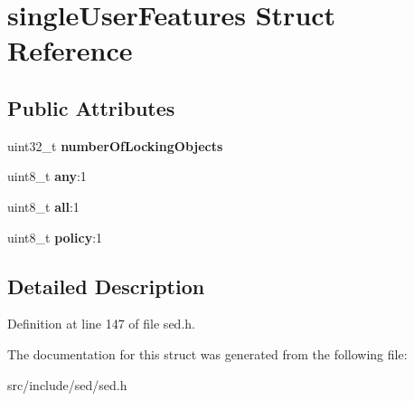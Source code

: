 \hypertarget{structsingleUserFeatures}{}\section{single\+User\+Features Struct Reference}
\label{structsingleUserFeatures}
\subsection*{Public Attributes}
\begin{DoxyCompactItemize}
\item 
\hypertarget{structsingleUserFeatures_a1e1a2472c0aeba6ce122848281614058}{}uint32\+\_\+t {\bfseries number\+Of\+Locking\+Objects}\label{structsingleUserFeatures_a1e1a2472c0aeba6ce122848281614058}

\item 
\hypertarget{structsingleUserFeatures_ac72e88c911c17af0284cb00d3021f2ed}{}uint8\+\_\+t {\bfseries any}\+:1\label{structsingleUserFeatures_ac72e88c911c17af0284cb00d3021f2ed}

\item 
\hypertarget{structsingleUserFeatures_a4fb3ca07288e5249996fa82815e67ab3}{}uint8\+\_\+t {\bfseries all}\+:1\label{structsingleUserFeatures_a4fb3ca07288e5249996fa82815e67ab3}

\item 
\hypertarget{structsingleUserFeatures_ae9c587dab3ec48c6ca5c6a92c2480ae4}{}uint8\+\_\+t {\bfseries policy}\+:1\label{structsingleUserFeatures_ae9c587dab3ec48c6ca5c6a92c2480ae4}

\end{DoxyCompactItemize}


\subsection{Detailed Description}


Definition at line 147 of file sed.\+h.



The documentation for this struct was generated from the following file\+:\begin{DoxyCompactItemize}
\item 
src/include/sed/sed.\+h\end{DoxyCompactItemize}
